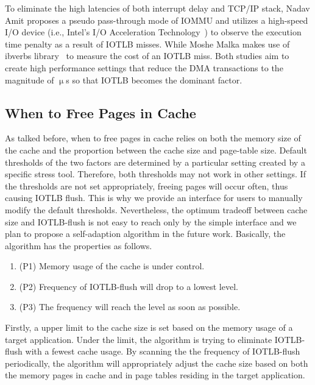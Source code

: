 To eliminate the high latencies of both interrupt delay and TCP/IP stack, Nadav Amit proposes a pseudo pass-through mode of IOMMU and utilizes a high-speed I/O device (i.e., Intel’s I/O Acceleration Technology~\cite{lauritzenintel}) to observe the execution time penalty as a result of IOTLB misses. While Moshe Malka makes use of ibverbs library~\cite{ibverbsevaluation,kerr2011dissecting} to measure the cost of an IOTLB miss.
Both studies aim to create high performance settings that reduce the DMA transactions to the magnitude of $\upmu$s so that IOTLB becomes the dominant factor.

\subsection{When to Free Pages in Cache}

As talked before, when to free pages in cache relies on both the memory size of the cache and the proportion between the cache size and page-table size. Default thresholds of the two factors are determined by a particular setting created by a specific stress tool. Therefore, both thresholds may not work in other settings. If the thresholds are not set appropriately, freeing pages will occur often, thus causing IOTLB flush. This is why we provide an interface for users to manually modify the default thresholds. Nevertheless, the optimum tradeoff between cache size and IOTLB-flush is not easy to reach only by the simple interface and we plan to propose a self-adaption algorithm in the future work. Basically, the algorithm has the properties as follows.
\begin{enumerate}
\item (P1) Memory usage of the cache is under control.
\item (P2) Frequency of IOTLB-flush will drop to a lowest level.
\item (P3) The frequency will reach the level as soon as possible.
\end{enumerate}

Firstly, a upper limit to the cache size is set based on the memory usage of a target application. Under the limit, the algorithm is trying to eliminate IOTLB-flush with a fewest cache usage. By scanning the the frequency of IOTLB-flush periodically, the algorithm will appropriately adjust the cache size based on both the memory pages in cache and in page tables residing in the target application.




